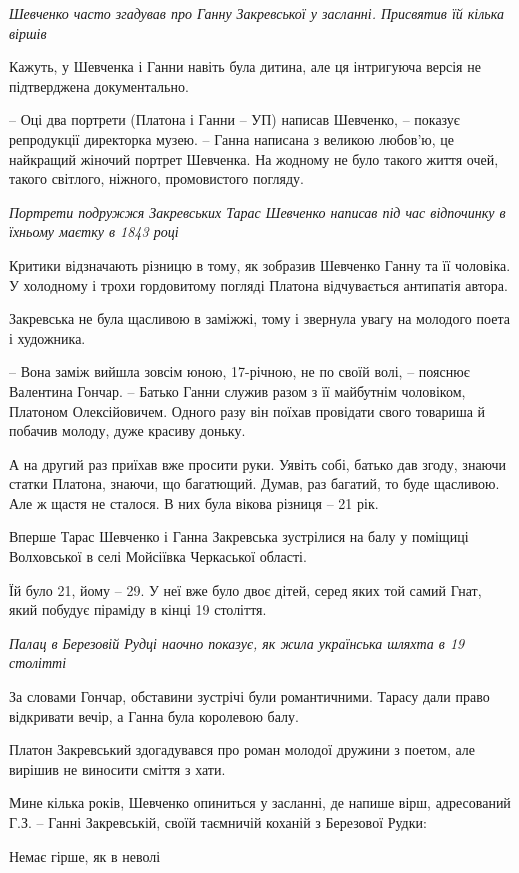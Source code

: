 \emph{Шевченко часто згадував про Ганну Закревської у засланні. Присвятив їй кілька віршів}

Кажуть, у Шевченка і Ганни навіть була дитина, але ця інтригуюча версія не
підтверджена документально.

– Оці два портрети (Платона і Ганни – УП) написав Шевченко, – показує
репродукції директорка музею. – Ганна написана з великою любов’ю, це найкращий
жіночий портрет Шевченка. На жодному не було такого життя очей, такого
світлого, ніжного, промовистого погляду. 

\emph{Портрети подружжя Закревських Тарас Шевченко написав під час відпочинку в їхньому маєтку в 1843 році}

Критики відзначають різницю в тому, як зобразив Шевченко Ганну та її чоловіка.
У холодному і трохи гордовитому погляді Платона відчувається антипатія автора.

Закревська не була щасливою в заміжжі, тому і звернула увагу на молодого поета
і художника.

– Вона заміж вийшла зовсім юною, 17-річною, не по своїй волі, – пояснює
Валентина Гончар. –  Батько Ганни служив разом з її майбутнім чоловіком,
Платоном Олексійовичем. Одного разу він поїхав провідати свого товариша й
побачив молоду, дуже красиву доньку. 

А на другий раз приїхав вже просити руки. Уявіть собі, батько дав згоду, знаючи
статки Платона, знаючи, що багатющий. Думав, раз багатий, то буде щасливою. Але
ж щастя не сталося. В них була вікова різниця – 21 рік. 

Вперше Тарас Шевченко і Ганна Закревська зустрілися на балу у поміщиці
Волховської в селі Мойсіївка Черкаської області. 

Їй було 21, йому – 29. У неї вже було двоє дітей, серед яких той самий Гнат,
який побудує піраміду в кінці 19 століття.

\emph{Палац в Березовій Рудці наочно показує, як жила українська шляхта в 19 столітті}

За словами Гончар, обставини зустрічі були романтичними. Тарасу дали право
відкривати вечір, а Ганна була королевою балу.

Платон Закревський здогадувався про роман молодої дружини з поетом, але вирішив
не виносити сміття з хати.

Мине кілька років, Шевченко опиниться у засланні, де напише вірш, адресований
Г.З. – Ганні Закревській, своїй таємничій коханій з Березової Рудки:

Немає гірше, як в неволі

